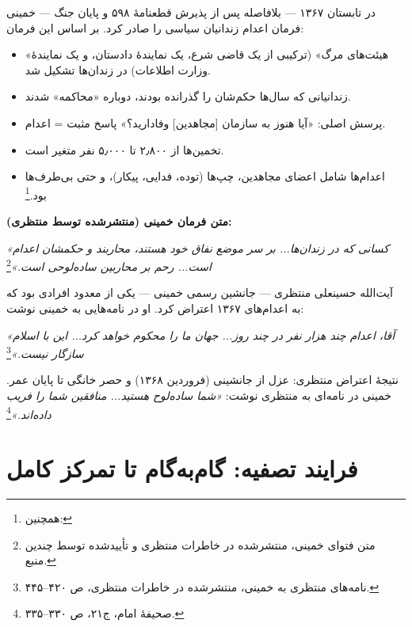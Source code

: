 \begin{warningBox}
در تابستان ۱۳۶۷ — بلافاصله پس از پذیرش قطعنامهٔ ۵۹۸ و پایان جنگ — خمینی فرمان اعدام زندانیان سیاسی را صادر کرد. بر اساس این فرمان:

\begin{itemize}[label=\textcolor{cAccent}{$\bullet$}, rightmargin=2em]
    \item «هیئت‌های مرگ» (ترکیبی از یک قاضی شرع، یک نمایندهٔ دادستان، و یک نمایندهٔ وزارت اطلاعات) در زندان‌ها تشکیل شد.
    \item زندانیانی که سال‌ها حکم‌شان را گذرانده بودند، دوباره «محاکمه» شدند.
    \item پرسش اصلی: «آیا هنوز به سازمان [مجاهدین] وفادارید؟» پاسخ مثبت = اعدام.
    \item تخمین‌ها از ۲٫۸۰۰ تا ۵٫۰۰۰ نفر متغیر است.
    \item اعدام‌ها شامل اعضای مجاهدین، چپ‌ها (توده، فدایی، پیکار)، و حتی بی‌طرف‌ها بود.\footnote{ همچنین: }
\end{itemize}

\textbf{متن فرمان خمینی (منتشرشده توسط منتظری):}

\textit{«کسانی که در زندان‌ها... بر سر موضع نفاق خود هستند، محاربند و حکمشان اعدام است... رحم بر محاربین ساده‌لوحی است.»}\footnote{متن فتوای خمینی، منتشرشده در خاطرات منتظری و تأیید‌شده توسط چندین منبع. }
\end{warningBox}

\begin{noteBox}
آیت‌الله حسینعلی منتظری — جانشین رسمی خمینی — یکی از معدود افرادی بود که به اعدام‌های ۱۳۶۷ اعتراض کرد. او در نامه‌هایی به خمینی نوشت:

\textit{«آقا، اعدام چند هزار نفر در چند روز... جهان ما را محکوم خواهد کرد... این با اسلام سازگار نیست.»}\footnote{نامه‌های منتظری به خمینی، منتشرشده در خاطرات منتظری، ص ۴۲۰–۴۴۵.}

نتیجهٔ اعتراض منتظری: عزل از جانشینی (فروردین ۱۳۶۸) و حصر خانگی تا پایان عمر. خمینی در نامه‌ای به منتظری نوشت: \textit{«شما ساده‌لوح هستید... منافقین شما را فریب داده‌اند.»}\footnote{صحیفهٔ امام، ج۲۱، ص ۳۳۰–۳۳۵.}
\end{noteBox}

\section{فرایند تصفیه: گام‌به‌گام تا تمرکز کامل}

